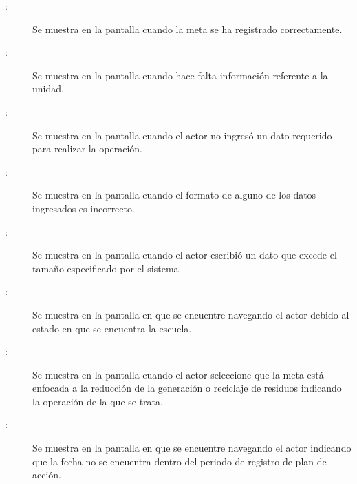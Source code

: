 \begin{description}
	\item[:] Se muestra en la pantalla  cuando la meta se ha registrado correctamente.
	\item[:] Se muestra en la pantalla  cuando hace falta información referente a la unidad.
	\item[:] Se muestra en la pantalla  cuando el actor no ingresó un dato requerido para realizar la operación.
	\item[:] Se muestra en la pantalla  cuando el formato de alguno de los datos ingresados es incorrecto.
	\item[:] Se muestra en la pantalla  cuando el actor escribió un dato que excede el tamaño especificado por el sistema.
	\item[:] Se muestra en la pantalla en que se encuentre navegando el actor debido al estado en que se encuentra la escuela.	
	\item[:] Se muestra en la pantalla  cuando el actor seleccione que la meta está enfocada a la reducción de la generación o reciclaje de residuos indicando la operación de la que se trata.
	\item[:] Se muestra en la pantalla en que se encuentre navegando el actor indicando que la fecha no se encuentra dentro del periodo de registro de plan de acción.
	
\end{description}
